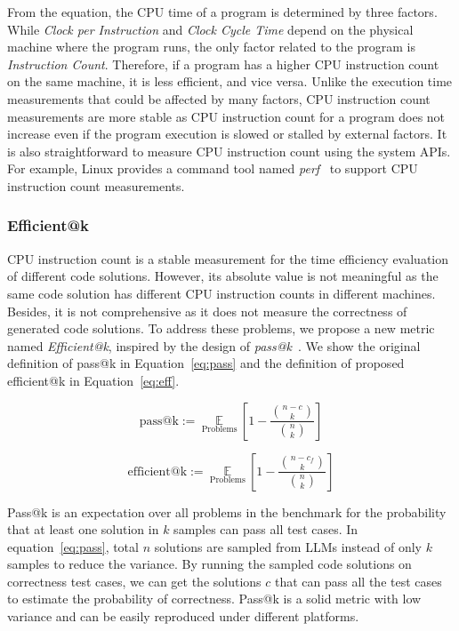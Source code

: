 From the equation, the CPU time of a program is determined by three factors. While \textit{Clock per Instruction} and \textit{Clock Cycle Time} depend on the physical machine where the program runs, the only factor related to the program is \textit{Instruction Count}. Therefore, if a program has a higher CPU instruction count on the same machine, it is less efficient, and vice versa. Unlike the execution time measurements that could be affected by many factors, CPU instruction count measurements are more stable as CPU instruction count for a program does not increase even if the program execution is slowed or stalled by external factors. It is also straightforward to measure CPU instruction count using the system APIs. For example, Linux provides a command tool named \textit{perf}~\cite{perf} to support CPU instruction count measurements.


\subsubsection{Efficient@k} CPU instruction count is a stable measurement for the time efficiency evaluation of different code solutions. However, its absolute value is not meaningful as the same code solution has different CPU instruction counts in different machines. Besides, it is not comprehensive as it does not measure the correctness of generated code solutions. To address these problems, we propose a new metric named \textit{Efficient@k}, inspired by the design of \textit{pass@k}~\cite{humaneval}. We show the original definition of pass@k in Equation~\ref{eq:pass} and the definition of proposed efficient@k in Equation~\ref{eq:eff}.

\begin{equation}\label{eq:pass}
    \text{pass@k}:=\underset{\text { Problems }}{\mathbb{E}}\left[1-\frac{\binom{n-c}{k}}{\binom{n}{k}}\right]
\end{equation}

\begin{equation}\label{eq:eff}
    \text{efficient@k}:=\underset{\text { Problems }}{\mathbb{E}}\left[1-\frac{\binom{n-c_f}{k}}{\binom{n}{k}}\right]
\end{equation}

Pass@k is an expectation over all problems in the benchmark for the probability that at least one solution in $k$ samples can pass all test cases. In equation~\ref{eq:pass}, total $n$ solutions are sampled from LLMs instead of only $k$ samples to reduce the variance. By running the sampled code solutions on correctness test cases, we can get the solutions $c$ that can pass all the test cases to estimate the probability of correctness. Pass@k is a solid metric with low variance and can be easily reproduced under different platforms. 

